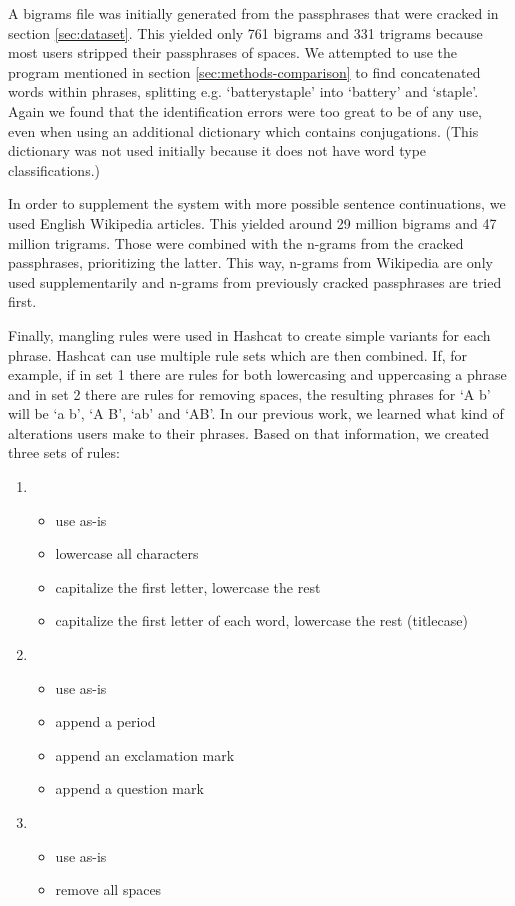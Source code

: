 \documentclass{article}
\begin{document}
A bigrams file was initially generated from the passphrases that were cracked
in section \ref{sec:dataset}. This yielded only 761 bigrams and 331 trigrams
because most users stripped their passphrases of spaces. We attempted to use
the program mentioned in section \ref{sec:methods-comparison} to find
concatenated words within phrases, splitting e.g. `batterystaple' into
`battery' and `staple'. Again we found that the identification errors were too
great to be of any use, even when using an additional
dictionary\cite{wamerican} which contains conjugations. (This dictionary was
not used initially because it does not have word type classifications.)

In order to supplement the system with more possible sentence continuations, we
used English Wikipedia articles. This yielded around 29 million bigrams and 47
million trigrams. Those were combined with the n-grams from the cracked
passphrases, prioritizing the latter. This way, n-grams from Wikipedia are only
used supplementarily and n-grams from previously cracked passphrases are tried
first.

Finally, mangling rules were used in Hashcat to create simple variants for each
phrase. Hashcat can use multiple rule sets which are then combined. If, for
example, if in set 1 there are rules for both lowercasing and uppercasing a
phrase and in set 2 there are rules for removing spaces, the resulting phrases
for `A b' will be `a b', `A B', `ab' and `AB'. In our previous work, we learned
what kind of alterations users make to their phrases. Based on that information,
we created three sets of rules:

\begin{enumerate}
	\item \begin{itemize}
		\item use as-is
		\item lowercase all characters
		\item capitalize the first letter, lowercase the rest
		\item capitalize the first letter of each word, lowercase the rest (titlecase)
	\end{itemize}

	\item \begin{itemize}
		\item use as-is
		\item append a period
		\item append an exclamation mark
		\item append a question mark
	\end{itemize}

	\item \begin{itemize}
		\item use as-is
		\item remove all spaces
	\end{itemize}
\end{enumerate}
\end{document}
